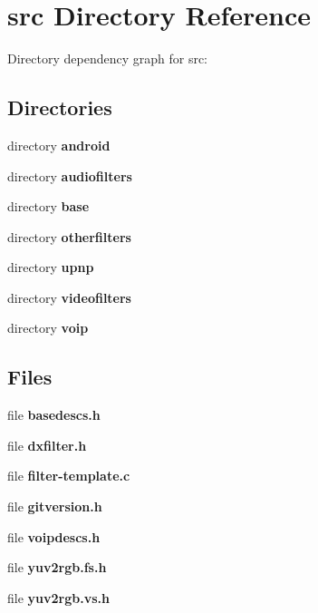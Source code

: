 \section{src Directory Reference}
\label{dir_68267d1309a1af8e8297ef4c3efbcdba}
Directory dependency graph for src\-:
\subsection*{Directories}
\begin{DoxyCompactItemize}
\item 
directory {\bf android}
\item 
directory {\bf audiofilters}
\item 
directory {\bf base}
\item 
directory {\bf otherfilters}
\item 
directory {\bf upnp}
\item 
directory {\bf videofilters}
\item 
directory {\bf voip}
\end{DoxyCompactItemize}
\subsection*{Files}
\begin{DoxyCompactItemize}
\item 
file {\bfseries basedescs.\-h}
\item 
file {\bfseries dxfilter.\-h}
\item 
file {\bfseries filter-\/template.\-c}
\item 
file {\bfseries gitversion.\-h}
\item 
file {\bfseries voipdescs.\-h}
\item 
file {\bfseries yuv2rgb.\-fs.\-h}
\item 
file {\bfseries yuv2rgb.\-vs.\-h}
\end{DoxyCompactItemize}
